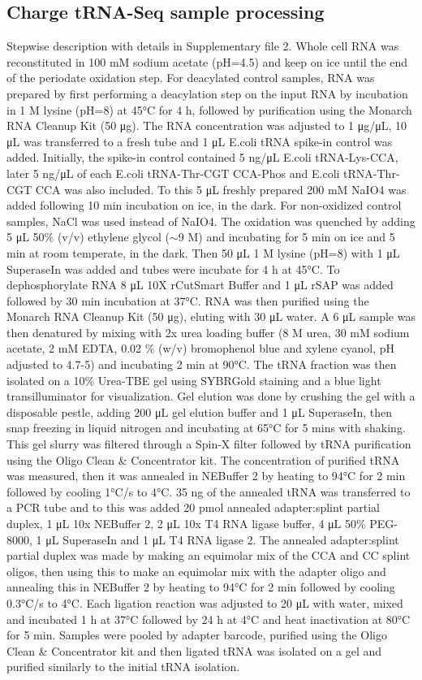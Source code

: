 \documentclass[9pt,lineno]{elife}
\begin{document}
\subsection{Charge tRNA-Seq sample processing}
Stepwise description with details in Supplementary file 2.
Whole cell RNA was reconstituted in 100 mM sodium acetate (pH=4.5) and keep on ice until the end of the periodate oxidation step.
For deacylated control samples, RNA was prepared by first performing a deacylation step on the input RNA by incubation in 1 M lysine (pH=8) at 45°C for 4 h, followed by purification using the Monarch RNA Cleanup Kit (50 μg).
The RNA concentration was adjusted to 1 μg/μL, 10 μL was transferred to a fresh tube and 1 μL E.coli tRNA spike-in control was added.
Initially, the spike-in control contained 5 ng/μL E.coli tRNA-Lys-CCA, later 5 ng/μL of each E.coli tRNA-Thr-CGT CCA-Phos and E.coli tRNA-Thr-CGT CCA was also included.
To this 5 μL freshly prepared 200 mM NaIO4 was added following 10 min incubation on ice, in the dark.
For non-oxidized control samples, NaCl was used instead of NaIO4.
The oxidation was quenched by adding 5 μL 50\% (v/v) ethylene glycol ($\sim$9 M) and incubating for 5 min on ice and 5 min at room temperate, in the dark.
Then 50 μL 1 M lysine (pH=8) with 1 μL SuperaseIn was added and tubes were incubate for 4 h at 45°C.
To dephosphorylate RNA 8 μL 10X rCutSmart Buffer and 1 μL rSAP was added followed by 30 min incubation at 37°C.
RNA was then purified using the Monarch RNA Cleanup Kit (50 μg), eluting with 30 μL water.
A 6 μL sample was then denatured by mixing with 2x urea loading buffer (8 M urea, 30 mM sodium acetate, 2 mM EDTA, 0.02 \% (w/v) bromophenol blue and xylene cyanol, pH adjusted to 4.7-5) and incubating 2 min at 90°C.
The tRNA fraction was then isolated on a 10\% Urea-TBE gel using SYBRGold staining and a blue light transilluminator for visualization.
Gel elution was done by crushing the gel with a disposable pestle, adding 200 μL gel elution buffer and 1 μL SuperaseIn, then snap freezing in liquid nitrogen and incubating at 65°C for 5 mins with shaking.
This gel slurry was filtered through a Spin-X filter followed by tRNA purification using the Oligo Clean \& Concentrator kit.
The concentration of purified tRNA was measured, then it was annealed in  NEBuffer 2 by heating to 94°C for 2 min followed by cooling 1°C/s to 4°C.
35 ng of the annealed tRNA was transferred to a PCR tube and to this was added 20 pmol annealed adapter:splint partial duplex, 1 μL 10x NEBuffer 2, 2 μL 10x T4 RNA ligase buffer, 4 μL 50\% PEG-8000, 1 μL SuperaseIn and 1 μL T4 RNA ligase 2.
The annealed adapter:splint partial duplex was made by making an equimolar mix of the CCA and CC splint oligos, then using this to make an equimolar mix with the adapter oligo and annealing this in NEBuffer 2 by heating to 94°C for 2 min followed by cooling 0.3°C/s to 4°C.
Each ligation reaction was adjusted to 20 μL with water, mixed and incubated 1 h at 37°C followed by 24 h at 4°C and heat inactivation at 80°C for 5 min.
Samples were pooled by adapter barcode, purified using the Oligo Clean \& Concentrator kit and then ligated tRNA was isolated on a gel and purified similarly to the initial tRNA isolation.
\end{document}
